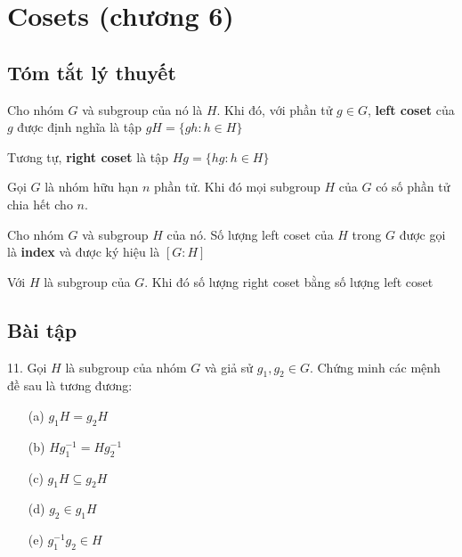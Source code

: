 \section{Cosets (chương 6)}

\subsection{Tóm tắt lý thuyết}

\begin{definition}
    Cho nhóm $G$ và subgroup của nó là $H$. Khi đó, với phần tử $g \in G$, \textbf{left coset} của $g$ được định nghĩa là tập $gH = \{gh : h \in H\}$
\end{definition}

\begin{definition}
    Tương tự, \textbf{right coset} là tập $Hg = \{hg : h \in H\}$
\end{definition}

\begin{theorem}
    Gọi $G$ là nhóm hữu hạn $n$ phần tử. Khi đó mọi subgroup $H$ của $G$ có số phần tử chia hết cho $n$.
\end{theorem}

\begin{definition}
    Cho nhóm $G$ và subgroup $H$ của nó. Số lượng left coset của $H$  trong $G$ được gọi là \textbf{index} và được ký hiệu là $[G:H]$
\end{definition}

\begin{theorem}
    Với $H$ là subgroup của $G$. Khi đó số lượng right coset bằng số lượng left coset
\end{theorem}

\subsection{Bài tập}

11. Gọi $H$ là subgroup của nhóm $G$ và giả sử $g_1, g_2 \in G$. Chứng minh các mệnh đề sau là tương đương:

\begin{itemize}
    \item[(a)] $g_1 H = g_2 H$
    \item[(b)] $H g_1^{-1} = H g_2^{-1}$
    \item[(c)] $g_1 H \subseteq g_2 H$
    \item[(d)] $g_2 \in g_1 H$
    \item[(e)] $g_1^{-1} g_2 \in H$ 
\end{itemize}

